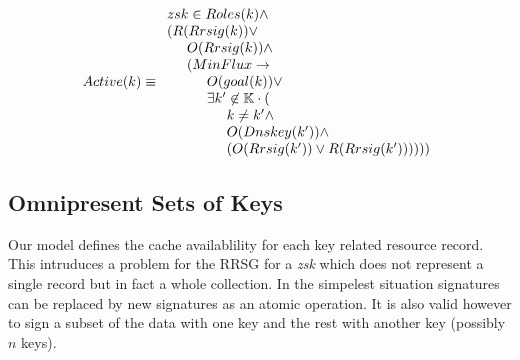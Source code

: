 \documentclass[twoside,english, a4paper]{article}
\begin{document}
\begin{equation}
Active(k) \equiv 
\begin{array}{l}
\hskip 0.0cm		zsk \in Roles(k) \wedge \\
\hskip 0.0cm		(R(Rrsig(k)) \vee \\
\hskip 0.5cm 		O(Rrsig(k)) \wedge \\
\hskip 0.5cm 		(MinFlux \rightarrow \\
\hskip 1.0cm 		O(goal(k)) \vee \\
\hskip 1.0cm 		\exists k' \not \in \mathbb{K} \cdot (\\
\hskip 1.5cm			k\neq k' \wedge \\
\hskip 1.5cm			O(Dnskey(k')) \wedge \\
\hskip 1.5cm			(O(Rrsig(k'))\vee R(Rrsig(k'))) )))
\end{array}
\end{equation}



\subsection{Omnipresent Sets of Keys}
\label{redifined-propagated}

Our model defines the cache availablility for each key related resource
record. This intruduces a problem for the RRSG for a \emph{zsk} which
does not represent a single record but in fact a whole collection. 
In the simpelest situation signatures can be replaced by new signatures 
as an atomic operation. It is also valid however to sign a subset of
the data with one key and the rest with another key (possibly $n$ keys).
\end{document}

